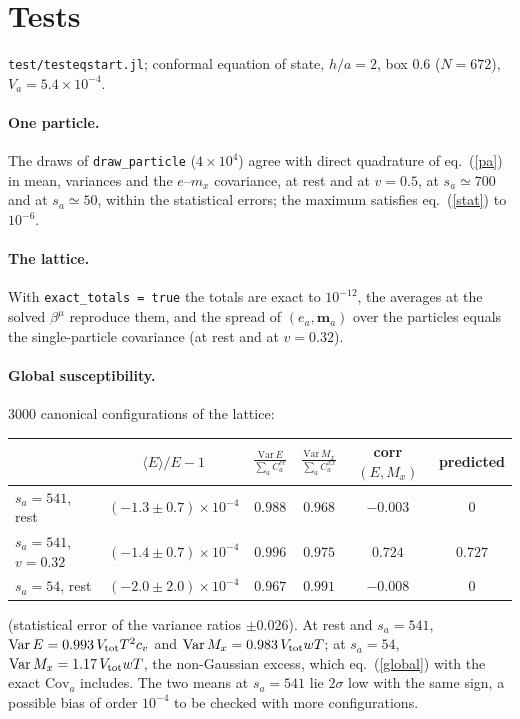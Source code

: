 \documentclass[11pt,aps,preprint,nofootinbib,superscriptaddress,tightenlines]{revtex4-2}
\def\Eq#1{eq.~(\ref{#1})}
\newcommand{\avg}[1]{\langle #1\rangle}
\let\oldparagraph\paragraph
\renewcommand{\paragraph}{\par\bigskip\oldparagraph}
\begin{document}
\section{Tests}
\label{sec:tests}

\texttt{test/testeqstart.jl}; conformal equation of state, $h/a=2$, box $0.6$
($N=672$), $V_a=5.4\times10^{-4}$.

\paragraph{One particle.}  The draws of \texttt{draw\_particle} ($4\times10^4$) agree
with direct quadrature of \Eq{pa} in mean, variances and the $e$--$m_x$ covariance, at
rest and at $v=0.5$, at $s_a\simeq700$ and at $s_a\simeq50$, within the statistical
errors; the maximum satisfies \Eq{stat} to $10^{-6}$.

\paragraph{The lattice.}  With \texttt{exact\_totals = true} the totals are exact to $10^{-12}$,
the averages at the solved $\beta^\mu$ reproduce them, and the spread of $(e_a,\bm m_a)$
over the particles equals the single-particle covariance (at rest and at $v=0.32$).

\paragraph{Global susceptibility.}  $3000$ canonical configurations of the lattice:
\begin{center}
\begin{tabular}{lccccc}
\hline
 & $\avg{E}/E-1$ & $\frac{\mathrm{Var}\,E}{\sum_a C_a^{ee}}$ & $\frac{\mathrm{Var}\,M_x}{\sum_a C_a^{xx}}$ & corr$(E,M_x)$ & predicted \\ \hline
$s_a=541$, rest & $(-1.3\pm0.7)\times10^{-4}$ & $0.988$ & $0.968$ & $-0.003$ & $0$ \\
$s_a=541$, $v=0.32$ & $(-1.4\pm0.7)\times10^{-4}$ & $0.996$ & $0.975$ & $0.724$ & $0.727$ \\
$s_a=54$, rest & $(-2.0\pm2.0)\times10^{-4}$ & $0.967$ & $0.991$ & $-0.008$ & $0$ \\
\hline
\end{tabular}
\end{center}
(statistical error of the variance ratios $\pm0.026$).  At rest and $s_a=541$,
$\mathrm{Var}\,E=0.993\,V_{\rm tot}T^2c_v$ and $\mathrm{Var}\,M_x=0.983\,V_{\rm tot}wT$; at
$s_a=54$, $\mathrm{Var}\,M_x=1.17\,V_{\rm tot}wT$, the non-Gaussian excess, which \Eq{global}
with the exact $\mathrm{Cov}_a$ includes.  The two means at $s_a=541$ lie $2\sigma$ low with
the same sign, a possible bias of order $10^{-4}$ to be checked with more configurations.
\end{document}
